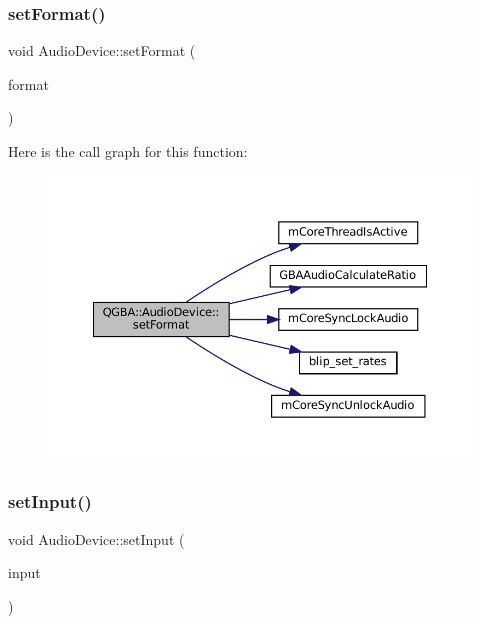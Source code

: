 \subsubsection{\texorpdfstring{set\+Format()}{setFormat()}}
{\footnotesize\ttfamily void Audio\+Device\+::set\+Format (\begin{DoxyParamCaption}\item[{const Q\+Audio\+Format \&}]{format }\end{DoxyParamCaption})}

Here is the call graph for this function\+:
\nopagebreak
\begin{figure}[H]
\begin{center}
\leavevmode
\includegraphics[width=350pt]{class_q_g_b_a_1_1_audio_device_a915f477a13b2dd451f3989b7efff8700_cgraph}
\end{center}
\end{figure}
\mbox{\label{class_q_g_b_a_1_1_audio_device_aa21048505d5564208f80052bfb6d14e4}} 
\subsubsection{\texorpdfstring{set\+Input()}{setInput()}}
{\footnotesize\ttfamily void Audio\+Device\+::set\+Input (\begin{DoxyParamCaption}\item[{m\+Core\+Thread $\ast$}]{input }\end{DoxyParamCaption})}

\mbox{\label{class_q_g_b_a_1_1_audio_device_a50453569f7759d3ca48b75b4eb187952}} 
